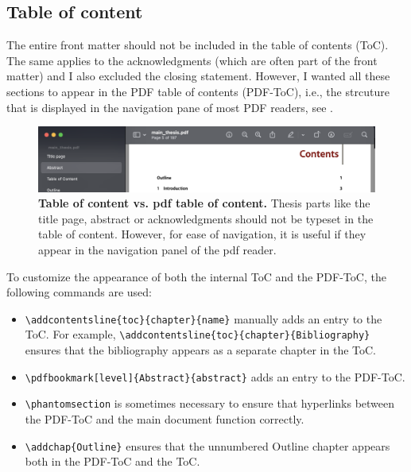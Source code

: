 \subsection{Table of content}
The entire front matter should not be included in the table of contents (ToC). The same applies to the acknowledgments (which are often part of the front matter) and I also excluded the closing statement. However, I wanted all these sections to appear in the PDF table of contents (PDF-ToC), i.e., the strcuture that is displayed in the navigation pane of most PDF readers, see .

\begin{figure}
	\includegraphics[width = \textwidth]{pdf-toc.png}
	\caption{\textbf{Table of content vs. pdf table of content.} Thesis parts like the title page, abstract or acknowledgments should not be typeset in the table of content. However, for ease of navigation, it is useful if they appear in the navigation panel of the pdf reader.}
	\label{fig:pdf-toc}
\end{figure}

To customize the appearance of both the internal ToC and the PDF-ToC, the following commands are used:
\begin{itemize}
	\item \verb|\addcontentsline{toc}{chapter}{name}|  manually adds an entry to the ToC.  For example, \verb|\addcontentsline{toc}{chapter}{Bibliography}| ensures that the bibliography appears as a separate chapter in the ToC.
	\item \verb|\pdfbookmark[level]{Abstract}{abstract}| adds an entry to the PDF-ToC.
	\item \verb|\phantomsection| is sometimes necessary to ensure that hyperlinks between the PDF-ToC and the main document function correctly.
	\item \verb|\addchap{Outline}| ensures that the unnumbered Outline chapter appears both in the PDF-ToC and the ToC.
\end{itemize} 


